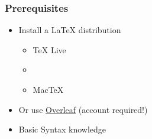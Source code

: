 \begin{frame}
    \frametitle{Prerequisites}
    \begin{itemize}
        \item Install a \LaTeX{} distribution
        \begin{itemize}
            \item \TeX{} Live %
            \item {}
            \item Mac\TeX{}
        \end{itemize}
        \item Or use \href{https://www.overleaf.com/}{Overleaf} (account required!)
        \item Basic Syntax knowledge
    \end{itemize}
\end{frame}

